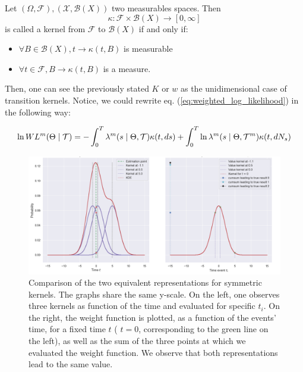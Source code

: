 \begin{definition}
Let $(\Omega, \mathcal F), ( \mathcal X, \mathcal B (X) )$ two measurables spaces. Then $$ \kappa : \mathcal F \times \mathcal B (X) \to [0, \infty] $$ is called a kernel from $\mathcal F$ to $\mathcal B(X)$ if and only if:

\begin{itemize}
\setlength{\itemindent}{3. cm}
\item $\forall B \in \mathcal B(X), t \to \kappa(  t, B)$ is measurable
\item $\forall t \in \mathcal F, B \to \kappa(  t, B)$ is a measure.
\end{itemize}
\end{definition}

Then, one can see the previously stated $K$ or $w$ as the unidimensional case of transition kernels. Notice, we could rewrite eq. (\ref{eq:weighted_log_likelihood}) in the following way:

$$ \ln W L^m( \Theta \mid \mathcal{T} ) = - \int_0^T \lambda^{m} ( s \mid \Theta , \mathcal{T} ) \kappa(t, ds) + \int_0^T \ln \lambda^{m} ( s \mid \Theta , \mathcal{T}^m ) \kappa(t, d N_s)  $$

\begin{figure}
\centering
\includegraphics[width = 1.00 \textwidth]{../imag/chap3/CKDE.png}
\caption{Comparison of the two equivalent representations for symmetric kernels. The graphs share the same y-scale. On the left, one observes three kernels as function of the time and evaluated for specific $t_i$. On the right, the weight function is plotted, as a function of the events' time, for a fixed time $t$ ( $t= 0$, corresponding to the green line on the left), as well as the sum of the three points at which we evaluated the weight function. We observe that both representations lead to the same value.}
\label{fig:CKDE}
\end{figure}

